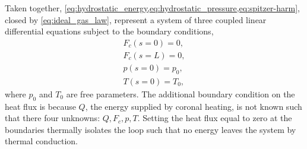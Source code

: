 Taken together, \cref{eq:hydrostatic_energy,eq:hydrostatic_pressure,eq:spitzer-harm}, closed by \autoref{eq:ideal_gas_law}, represent a system of three coupled linear differential equations subject to the boundary conditions,
\begin{align}
    F_c(s=0) = 0, \label{eq:hydrostatic:bc1}\\
    F_c(s=L) = 0, \label{eq:hydrostatic:bc2}\\
    p(s=0) = p_0, \\
    T(s=0) = T_0,
\end{align}
where $p_0$ and $T_0$ are free parameters. The additional boundary condition on the heat flux is because $Q$, the energy supplied by coronal heating, is not known such that there four unknowns: $Q,F_c,p,T$. Setting the heat flux equal to zero at the boundaries thermally isolates the loop such that no energy leaves the system by thermal conduction.

